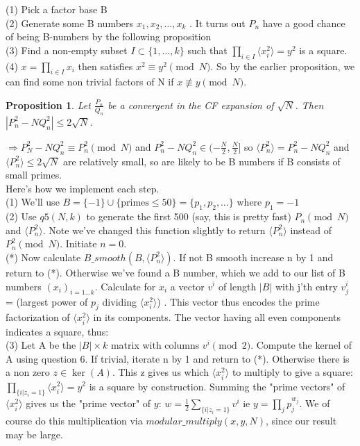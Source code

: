 \documentclass[10pt,a4paper]{report}
\newtheorem*{prop}{Proposition}
\begin{document}
(1) Pick a factor base B\\
(2) Generate some B numbers $x_1, x_2, \dots, x_k$ . It turns out $P_n$ have a good chance of being B-numbers by the following proposition\\
(3) Find a non-empty subset $I\subset\{1, \dots ,k\}$ such that $\prod_{i\in I}\langle x_i^2 \rangle=y^2$ is a square.\\
(4) $x=\prod_{i\in I}x_i$ then satisfies $x^2\equiv y^2 \pmod N$. So by the earlier proposition, we can find some non trivial factors of N if $x\not\equiv y \pmod N$. \\

\begin{prop}
Let $\frac{P_n}{Q_n}$ be a convergent in the CF expansion of $\sqrt{N}$. Then $|P_n^2-NQ_n^2|\leq2\sqrt{N}$.
\end{prop}

$\Rightarrow P_N^2-NQ_n^2 \equiv P_n^2 \pmod N$ and $P_n^2-NQ_n^2 \in (-\frac{N}{2}, \frac{N}{2}]$ so $\langle P_n^2\rangle = P_n^2-NQ_n^2$ and $\langle P_n^2\rangle\leq2\sqrt{N}$ are relatively small, so are likely to be B numbers if B consists of small primes.\\

Here's how we implement each step.\\

(1) We'll use $B= \{-1\} \cup \{\text{primes}\leq 50\}  = \{p_1, p_2, \dots\}$ where $p_1=-1$\\

(2) Use $q5(N,k)$ to generate the first 500 (say, this is pretty fast) $P_n \pmod N$ and $\langle P_n^2 \rangle$. Note we've changed this function slightly to return 
 $\langle P_n^2 \rangle$ instead of $P_n^2 \pmod N$. Initiate $n=0$.\\

(*) Now calculate $B\_smooth(B, \langle P_n^2 \rangle)$. If not B smooth increase n by 1 and return to (*). Otherwise we've found a B number, which we add to our list of B numbers $(x_i)_{i=1\dots k}$. Calculate for $x_i$ a vector  $v^{i}$ of length $|B|$ with j'th entry $v^{i}_j$= (largest power of $p_j$ dividing $\langle x_i^2 \rangle$) . This vector thus encodes the prime factorization of $\langle x_i^2 \rangle$ in its components. The vector having all even components indicates a square, thus:\\
 
(3) Let A be the $|B|\times k$ matrix with columns $v^{i} \pmod 2$. Compute the kernel of A using question 6. If trivial, iterate n by 1 and return to (*). Otherwise there is a non zero $z \in \ker{(A)}$. This z gives us which $\langle x_i^2 \rangle$ to multiply to give a square:  $\prod_{\{i | z_i = 1\}} \langle x_i^2 \rangle = y^2$ is a square by construction. Summing the "prime vectors" of $\langle x_i^2 \rangle$ gives us  the "prime vector" of $y$:   $w=\frac{1}{2}\sum_{\{i | z_i = 1\}}v^i$ ie $y=\prod_{j}p_j^{w_j}$. We of course do this multiplication via $modular\_multiply(x,y,N)$, since our result may be large. \\
\end{document}
